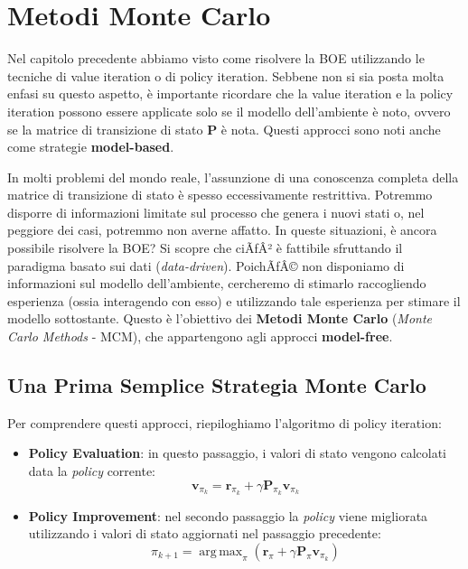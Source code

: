 ﻿\documentclass[11pt, a4paper]{report}
\DeclareMathOperator*{\argmax}{arg\,max}
\begin{document}
\newpage

\section{Metodi Monte Carlo}

Nel capitolo precedente abbiamo visto come risolvere la BOE utilizzando le tecniche di value iteration o di policy iteration. Sebbene non si sia posta molta enfasi su questo aspetto, è importante ricordare che la value iteration e la policy iteration possono essere applicate solo se il modello dell'ambiente è noto, ovvero se la matrice di transizione di stato $\bm{P}$ è nota. Questi approcci sono noti anche come strategie \textbf{model-based}.

In molti problemi del mondo reale, l'assunzione di una conoscenza completa della matrice di transizione di stato è spesso eccessivamente restrittiva. Potremmo disporre di informazioni limitate sul processo che genera i nuovi stati o, nel peggiore dei casi, potremmo non averne affatto. In queste situazioni, è ancora possibile risolvere la BOE? Si scopre che ciÃƒÂ² è fattibile sfruttando il paradigma basato sui dati (\emph{data-driven}). PoichÃƒÂ© non disponiamo di informazioni sul modello dell'ambiente, cercheremo di stimarlo raccogliendo esperienza (ossia interagendo con esso) e utilizzando tale esperienza per stimare il modello sottostante. Questo è l'obiettivo dei \textbf{Metodi Monte Carlo} (\emph{Monte Carlo Methods} - MCM), che appartengono agli approcci \textbf{model-free}.

\subsection{Una Prima Semplice Strategia Monte Carlo}

Per comprendere questi approcci, riepiloghiamo l'algoritmo di policy iteration:
\begin{itemize}
    \item \textbf{Policy Evaluation}: in questo passaggio, i valori di stato vengono calcolati data la \emph{policy} corrente:
    \begin{equation}
    \bm{v}_{\pi_k} = \bm{r}_{\pi_k} + \gamma \bm{P}_{\pi_k} \bm{v}_{\pi_k}
    \end{equation}
    \item \textbf{Policy Improvement}: nel secondo passaggio la \emph{policy} viene migliorata utilizzando i valori di stato aggiornati nel passaggio precedente:
    \begin{equation}
    \pi_{k+1} = \argmax_{\pi} (\bm{r}_\pi + \gamma \bm{P}_\pi \bm{v}_{\pi_k})
    \end{equation}
\end{itemize}
\end{document}
